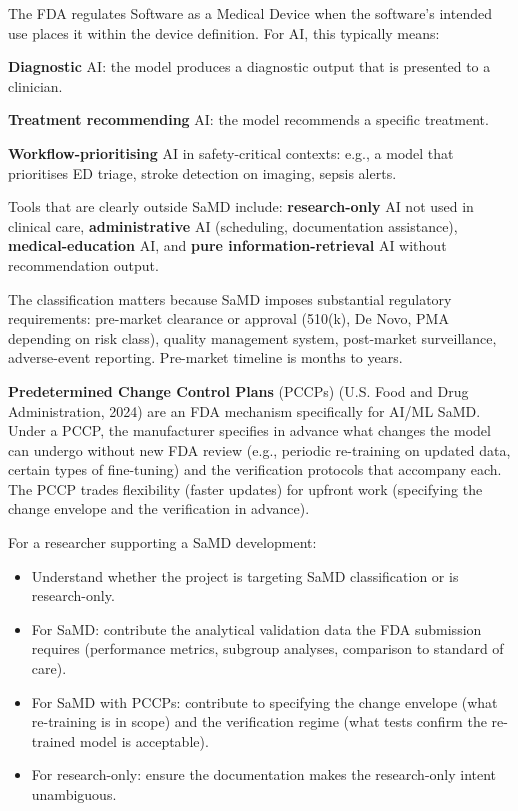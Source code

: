 \documentclass[
  letterpaper,
  11pt]{scrbook}
\providecommand{\tightlist}{%
  \setlength{\itemsep}{0pt}\setlength{\parskip}{0pt}}
\begin{document}
The FDA regulates Software as a Medical Device when the software's
intended use places it within the device definition. For AI, this
typically means:

\textbf{Diagnostic} AI: the model produces a diagnostic output that is
presented to a clinician.

\textbf{Treatment recommending} AI: the model recommends a specific
treatment.

\textbf{Workflow-prioritising} AI in safety-critical contexts: e.g., a
model that prioritises ED triage, stroke detection on imaging, sepsis
alerts.

Tools that are clearly outside SaMD include: \textbf{research-only} AI
not used in clinical care, \textbf{administrative} AI (scheduling,
documentation assistance), \textbf{medical-education} AI, and
\textbf{pure information-retrieval} AI without recommendation output.

The classification matters because SaMD imposes substantial regulatory
requirements: pre-market clearance or approval (510(k), De Novo, PMA
depending on risk class), quality management system, post-market
surveillance, adverse-event reporting. Pre-market timeline is months to
years.

\textbf{Predetermined Change Control Plans} (PCCPs) (U.S. Food and Drug
Administration, 2024) are an FDA mechanism specifically for AI/ML SaMD.
Under a PCCP, the manufacturer specifies in advance what changes the
model can undergo without new FDA review (e.g., periodic re-training on
updated data, certain types of fine-tuning) and the verification
protocols that accompany each. The PCCP trades flexibility (faster
updates) for upfront work (specifying the change envelope and the
verification in advance).

For a researcher supporting a SaMD development:

\begin{itemize}
\tightlist
\item
  Understand whether the project is targeting SaMD classification or is
  research-only.
\item
  For SaMD: contribute the analytical validation data the FDA submission
  requires (performance metrics, subgroup analyses, comparison to
  standard of care).
\item
  For SaMD with PCCPs: contribute to specifying the change envelope
  (what re-training is in scope) and the verification regime (what tests
  confirm the re-trained model is acceptable).
\item
  For research-only: ensure the documentation makes the research-only
  intent unambiguous.
\end{itemize}
\end{document}
